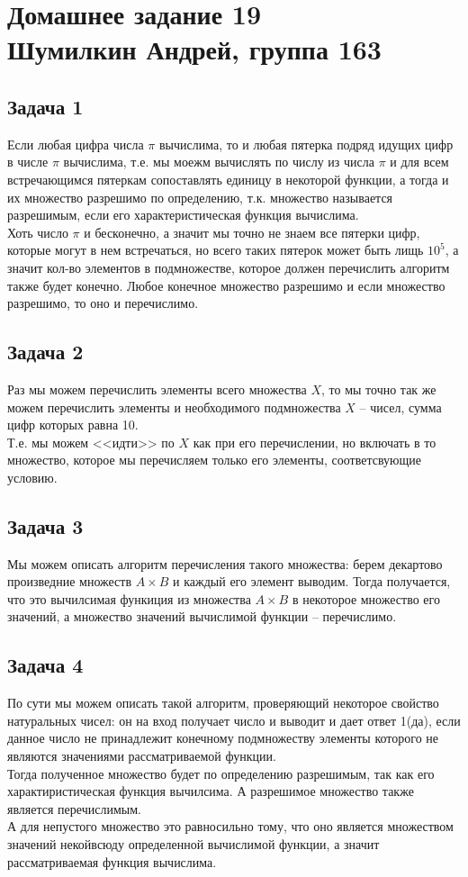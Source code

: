 

	\section{Домашнее задание 19\\ Шумилкин Андрей, группа 163} 
	\subsection{Задача 1}
	Если любая цифра числа $\pi$ вычислима, то и любая пятерка подряд идущих цифр в числе $\pi$ вычислима, т.е. мы моежм вычислять по числу из числа $\pi$  и для всем встречающимся пятеркам сопоставлять единицу в некоторой функции, а тогда и их множество разрешимо по определению, т.к. множество называется разрешимым, если его характеристическая функция вычислима. \\
	Хоть число $\pi$  и бесконечно, а значит мы точно не знаем все пятерки цифр, которые могут в нем встречаться, но всего таких пятерок может быть лищь $10^5$, а значит кол-во элементов в подмножестве, которое должен перечислить алгоритм также будет конечно. Любое конечное множество разрешимо и если множество разрешимо, то оно и перечислимо. \\
	
	\subsection{Задача 2}
	Раз мы можем перечислить элементы всего множества $X$, то мы точно так же можем перечислить элементы и необходимого подмножества $X$ -- чисел, сумма цифр которых равна 10. \\
	Т.е. мы можем <<идти>> по $X$ как при его перечислении, но включать в то множество, которое мы перечисляем только его элементы, соответсвующие условию. 
	
	\subsection{Задача 3}
	Мы можем описать алгоритм перечисления такого множества: берем декартово произведние множеств $A\times B$ и каждый его элемент выводим. Тогда получается, что это вычилсимая функиция из множества $A\times B$ в некоторое множество его значений, а множество значений вычислимой функции -- перечислимо. \\
	
	\subsection{Задача 4}
	По сути мы можем описать такой алгоритм, проверяющий некоторое свойство натуральных чисел: он на вход получает число и выводит и дает ответ 1(да), если данное число не принадлежит конечному подмножеству элементы которого не являются значениями рассматриваемой функции. \\
	Тогда полученное множество будет по определению разрешимым, так как его характиристическая функция вычилсима. А разрешимое множество также является перечислимым. \\
	А для непустого множество это равносильно тому, что оно является множеством значений некойвсюду определенной вычислимой функции, а значит рассматриваемая функция вычислима.
